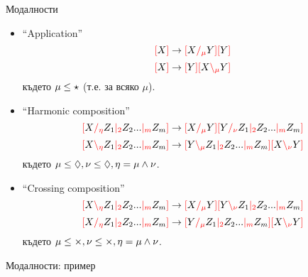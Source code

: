 \documentclass[9pt]{beamer}
\begin{document}
  \begin{frame}{Модалности}
    \begin{itemize}
      \item ``Application''
        \[ \lb X \rb \gderiv \lb X \rci{\mu} Y \rb \lb Y \rb \]
        \[ \lb X \rb \gderiv \lb Y \rb \lb X \lci{\mu} Y \rb \]
        където $\mu \less \modstar$ (т.е. за всяко $\mu$).
      \item ``Harmonic composition''
        \[ \lb X \rci{\eta} Z_1 \mci{2} Z_2 ... \mci{m} Z_m \rb \gderiv \lb X \rci{\mu} Y \rb \lb Y \rci{\nu} Z_1 \mci{2} Z_2 ... \mci{m} Z_m \rb \]
        \[ \lb X \lci{\eta} Z_1 \mci{2} Z_2 ... \mci{m} Z_m \rb \gderiv \lb Y \lci{\mu} Z_1 \mci{2} Z_2 ... \mci{m} Z_m \rb \lb X \lci{\nu} Y \rb \]
        където $\mu \less \modr, \nu \less \modr, \eta = \mu \meet \nu$.
      \item ``Crossing composition''
        \[ \lb X \lci{\eta} Z_1 \mci{2} Z_2 ... \mci{m} Z_m \rb \gderiv \lb X \rci{\mu} Y \rb \lb Y \lci{\nu} Z_1 \mci{2} Z_2 ... \mci{m} Z_m \rb \]
        \[ \lb X \rci{\eta} Z_1 \mci{2} Z_2 ... \mci{m} Z_m \rb \gderiv \lb Y \rci{\mu} Z_1 \mci{2} Z_2 ... \mci{m} Z_m \rb \lb X \lci{\nu} Y \rb \]
        където $\mu \less \modx, \nu \less \modx, \eta = \mu \meet \nu$.
    \end{itemize}
  \end{frame}

  \begin{frame}{Модалности: пример}

    \begin{center}
      \begin{minipage}{0.5\textwidth}
      \end{minipage}%
      \begin{minipage}{0.5\textwidth}
      \end{minipage}
    \end{center}
  \end{frame}
\end{document}
